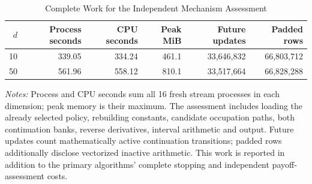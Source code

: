 \begin{table}[!htbp]
\centering
\footnotesize
\caption{Complete Work for the Independent Mechanism Assessment}\label{tab:r15mechanismwork}
\begin{tabular}{rrrrrr}
\toprule
$d$ & Process seconds & CPU seconds & Peak MiB & Future updates & Padded rows \\
\midrule
10 & 339.05 & 334.24 & 461.1 & 33,646,832 & 66,803,712 \\
50 & 561.96 & 558.12 & 810.1 & 33,517,664 & 66,828,288 \\
\bottomrule
\end{tabular}
\begin{minipage}{0.97\linewidth}\footnotesize
\emph{Notes:} Process and CPU seconds sum all 16 fresh stream processes in each dimension; peak memory is their maximum. The assessment includes loading the already selected policy, rebuilding constants, candidate occupation paths, both continuation banks, reverse derivatives, interval arithmetic and output. Future updates count mathematically active continuation transitions; padded rows additionally disclose vectorized inactive arithmetic. This work is reported in addition to the primary algorithms' complete stopping and independent payoff-assessment costs.
\end{minipage}
\end{table}
